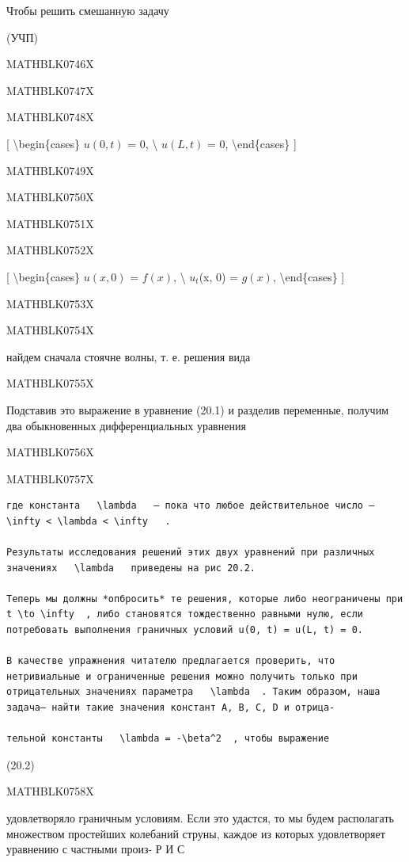\documentclass[
]{article}
\begin{document}
{{Чтобы решить смешанную задачу

(УЧП)

MATHBLK0746X

MATHBLK0747X

MATHBLK0748X

{[} \textbackslash begin\{cases\} \(u(0, t)\) = 0, \textbackslash{}
\(u(L, t)\) = 0, \textbackslash end\{cases\} {]}

MATHBLK0749X

MATHBLK0750X

MATHBLK0751X

MATHBLK0752X

{[} \textbackslash begin\{cases\} \(u(x, 0)\) = \(f(x)\),
\textbackslash{} \(u_t\)(x, 0) = \(g(x)\), \textbackslash end\{cases\}
{]}

MATHBLK0753X

MATHBLK0754X

найдем сначала стоячне волны, т. е. решения вида

MATHBLK0755X

Подставив это выражение в уравнение (20.1) и разделив переменные,
получим два обыкновенных дифференциальных уравнения

MATHBLK0756X

MATHBLK0757X

\begin{verbatim}
где константа   \lambda   — пока что любое действительное число —   \infty < \lambda < \infty   .

Результаты исследования решений этих двух уравнений при различных значениях   \lambda   приведены на рис 20.2.

Теперь мы должны *опбросить* те решения, которые либо неограничены при   t \to \infty  , либо становятся тождественно равными нулю, если потребовать выполнения граничных условий u(0, t) = u(L, t) = 0.

В качестве упражнения читателю предлагается проверить, что нетривиальные и ограниченные решения можно получить только при отрицательных значениях параметра   \lambda  . Таким образом, наша задача— найти такие значения констант A, B, C, D и отрица-

тельной константы   \lambda = -\beta^2  , чтобы выражение
\end{verbatim}

(20.2)

MATHBLK0758X

удовлетворяло граничным условиям. Если это удастся, то мы будем
располагать множеством простейших колебаний струны, каждое из которых
удовлетворяет уравнению с частными произ- Р И С

}}
\end{document}
